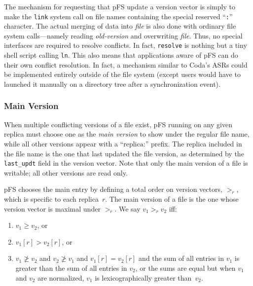 The mechanism for requesting that pFS update a version vector is
simply to make the {\tt link} system call on file names containing the
special reserved ``\texttt{:}'' character.  The actual merging of data
into \emph{file} is also done with ordinary file system calls---namely
reading \emph{old-version} and overwriting \emph{file}.  Thus, no
special interfaces are required to resolve conflicts.  In fact,
\texttt{resolve} is nothing but a tiny shell script calling
\texttt{ln}.  This also means that applications aware of pFS can do
their own conflict resolution.  In fact, a mechanism similar to Coda's
ASRs could be implemented entirely outside of the file system (except
users would have to launched it manually on a directory tree after a
synchronization event).


\subsubsection{Main Version}

When multiple conflicting versions of a file exist, pFS running on any
given replica must choose one as the \emph{main version} to show under
the regular file name, while all other versions appear with a
``$\mathrm{replica}\texttt{:}$'' prefix.  The replica included in the
file name is the one that last updated the file version, as determined
by the \texttt{last\_updt} field in the version vector.  Note that
only the main version of a file is writable; all other versions are
read only.

pFS chooses the main entry by defining a total order on version
vectors, $>_r$, which is specific to each replica~$r$.  The main
version of a file is the one whose version vector is maximal under
$>_r$.  We say $v_1>_rv_2$ iff:
\begin{enumerate}
\item $v_1\ge v_2$, or
\item $v_1[r]>v_2[r]$, or
\item $v_1\not\ge v_2$ and $v_2\not\ge v_1$ and $v_1[r]=v_2[r]$ and
  the sum of all entries in $v_1$ is greater than the sum of all
  entries in $v_2$, or the sums are equal but when $v_1$ and $v_2$ are
  normalized, $v_1$ is lexicographically greater than~$v_2$.
\end{enumerate}

